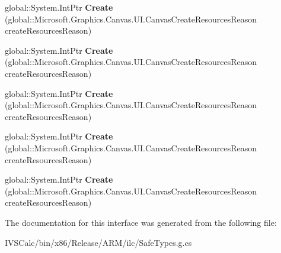 \begin{DoxyCompactItemize}
\item 
\mbox{\label{interface_microsoft_1_1_graphics_1_1_canvas_1_1_u_i_1_1_i_canvas_create_resources_event_args_factory_a0975690c403868d84f9333032d1c707e}} 
global\+::\+System.\+Int\+Ptr {\bfseries Create} (global\+::\+Microsoft.\+Graphics.\+Canvas.\+U\+I.\+Canvas\+Create\+Resources\+Reason create\+Resources\+Reason)
\item 
\mbox{\label{interface_microsoft_1_1_graphics_1_1_canvas_1_1_u_i_1_1_i_canvas_create_resources_event_args_factory_a0975690c403868d84f9333032d1c707e}} 
global\+::\+System.\+Int\+Ptr {\bfseries Create} (global\+::\+Microsoft.\+Graphics.\+Canvas.\+U\+I.\+Canvas\+Create\+Resources\+Reason create\+Resources\+Reason)
\item 
\mbox{\label{interface_microsoft_1_1_graphics_1_1_canvas_1_1_u_i_1_1_i_canvas_create_resources_event_args_factory_a0975690c403868d84f9333032d1c707e}} 
global\+::\+System.\+Int\+Ptr {\bfseries Create} (global\+::\+Microsoft.\+Graphics.\+Canvas.\+U\+I.\+Canvas\+Create\+Resources\+Reason create\+Resources\+Reason)
\item 
\mbox{\label{interface_microsoft_1_1_graphics_1_1_canvas_1_1_u_i_1_1_i_canvas_create_resources_event_args_factory_a0975690c403868d84f9333032d1c707e}} 
global\+::\+System.\+Int\+Ptr {\bfseries Create} (global\+::\+Microsoft.\+Graphics.\+Canvas.\+U\+I.\+Canvas\+Create\+Resources\+Reason create\+Resources\+Reason)
\item 
\mbox{\label{interface_microsoft_1_1_graphics_1_1_canvas_1_1_u_i_1_1_i_canvas_create_resources_event_args_factory_a0975690c403868d84f9333032d1c707e}} 
global\+::\+System.\+Int\+Ptr {\bfseries Create} (global\+::\+Microsoft.\+Graphics.\+Canvas.\+U\+I.\+Canvas\+Create\+Resources\+Reason create\+Resources\+Reason)
\end{DoxyCompactItemize}


The documentation for this interface was generated from the following file\+:\begin{DoxyCompactItemize}
\item 
I\+V\+S\+Calc/bin/x86/\+Release/\+A\+R\+M/ilc/Safe\+Types.\+g.\+cs\end{DoxyCompactItemize}
